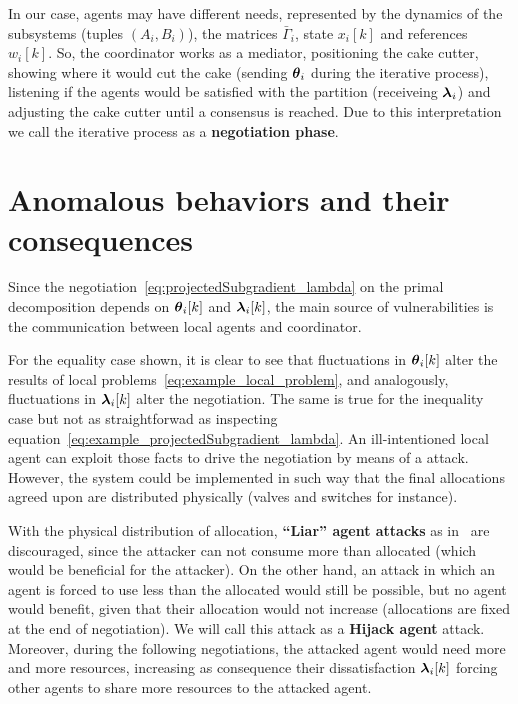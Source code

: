 \documentclass[../main.tex]{subfiles}
\begin{document}
In our case, agents may have different needs, represented by the dynamics of the subsystems (tuples $(A_{i},B_{i})$), the matrices $\bar{\Gamma}_{i}$, state $x_{i}[k]$ and references $w_{i}[k]$.
So, the coordinator works as a mediator, positioning the cake cutter, showing where it would cut the cake (sending $\boldsymbol{\theta}_i$ during the iterative process), listening if the agents would be satisfied with the partition (receiveing $\boldsymbol{\lambda}_i$) and adjusting the cake cutter until a consensus is reached.
Due to this interpretation we call the iterative process as a \textbf{negotiation phase}.



\section[Anomalous behaviors and their consequences]{Anomalous behaviors and their consequences}\label{sec:vulnerabilities_PD}

Since the negotiation~\eqref{eq:projectedSubgradient_lambda} on the primal decomposition depends on $\thetaik$ and $\lambdaik$, the main source of vulnerabilities is the communication between local agents and coordinator.

For the equality case shown, it is clear to see that fluctuations in $\thetaik$ alter the results of local problems~\eqref{eq:example_local_problem}, and analogously, fluctuations in $\lambdaik$ alter the negotiation.
The same is true for the inequality case but not as straightforwad as inspecting equation~\eqref{eq:example_projectedSubgradient_lambda}.
An ill-intentioned local agent can exploit those facts to drive the negotiation by means of a \fdi{} attack.
However, the system could be implemented in such way that the final allocations agreed upon are distributed physically (valves and switches for instance).

With the physical distribution of allocation, \textbf{``Liar'' agent attacks} as in~\cite{VelardeEtAl2017b} are discouraged, since the attacker can not consume more than allocated (which would be beneficial for the attacker).
On the other hand, an attack in which an agent is forced to use less than the allocated would still be possible, but no agent would benefit, given that their allocation would not increase (allocations are fixed at the end of negotiation).
We will call this attack as a \textbf{Hijack agent} attack.
Moreover, during the following negotiations, the attacked agent would need more and more resources, increasing as consequence their dissatisfaction $\lambdaik$ forcing other agents to share more resources to the attacked agent.
\end{document}
